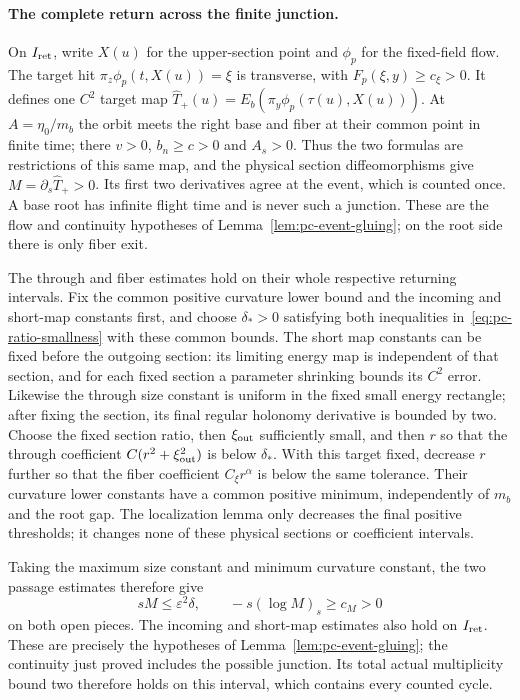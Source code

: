 \paragraph{The complete return across the finite junction.}
On $I_{\rm ret}$, write $X(u)$ for the upper-section point and
$\phi_p$ for the fixed-field flow. The target hit
$\pi_z\phi_p(t,X(u))=\xi$ is transverse, with $F_p(\xi,y)\ge c_\xi>0$.
It defines one $C^2$ target map
$\widehat T_+(u)=E_b(\pi_y\phi_p(\tau(u),X(u)))$.
At $A=\eta_0/m_b$ the orbit meets the right base and fiber at their
common point in finite time; there $v>0$, $b_n\ge c>0$ and $A_s>0$.
Thus the two formulas are restrictions of this same map, and the
physical section diffeomorphisms give $M=\partial_s\widehat T_+>0$.
Its first two derivatives agree at the event, which is counted once.
A base root has infinite flight time and is never such a junction.
These are the flow and continuity hypotheses of
Lemma~\ref{lem:pc-event-gluing}; on the root side there is only fiber exit.

The through and fiber estimates hold on their whole respective returning
intervals. Fix the common positive curvature lower bound and the incoming
and short-map constants first, and choose $\delta_*>0$ satisfying both
inequalities in~\eqref{eq:pc-ratio-smallness} with these common bounds. The short
map constants can be fixed before the outgoing section: its limiting
energy map is independent of that section, and for each fixed section a
parameter shrinking bounds its $C^2$ error. Likewise the through size
constant is uniform in the fixed small energy rectangle; after fixing
the section, its final regular holonomy derivative is bounded by two.
Choose the fixed section ratio, then $\xi_{\rm out}$ sufficiently small,
and then $r$ so that the through coefficient
$C(r^2+\xi_{\rm out}^2)$ is below $\delta_*$. With this target fixed,
decrease $r$ further so that the fiber coefficient $C_\xi r^\alpha$
is below the same tolerance. Their curvature lower constants have a
common positive minimum, independently of $m_b$ and the root gap.
The localization lemma only decreases the final positive thresholds;
it changes none of these physical sections or coefficient intervals.

Taking the maximum size constant and minimum curvature constant, the
two passage estimates therefore give
\[
 sM\le\varepsilon^2\delta,\qquad
 -s(\log M)_s\ge c_M>0
\]
on both open pieces. The incoming and short-map estimates also hold on
$I_{\rm ret}$. These are precisely the hypotheses of
Lemma~\ref{lem:pc-event-gluing}; the continuity just proved includes the
possible junction. Its total actual multiplicity bound two therefore
holds on this interval, which contains every counted cycle.

